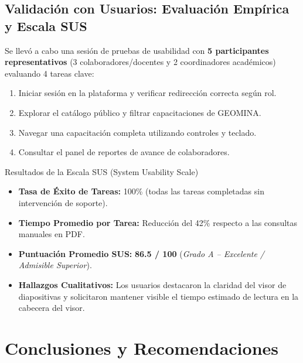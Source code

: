 \documentclass[11pt,a4paper]{article}
\begin{document}
\subsection{Validación con Usuarios: Evaluación Empírica y Escala SUS}
Se llevó a cabo una sesión de pruebas de usabilidad con \textbf{5 participantes representativos} (3 colaboradores/docentes y 2 coordinadores académicos) evaluando 4 tareas clave:
\begin{enumerate}
    \item Iniciar sesión en la plataforma y verificar redirección correcta según rol.
    \item Explorar el catálogo público y filtrar capacitaciones de GEOMINA.
    \item Navegar una capacitación completa utilizando controles y teclado.
    \item Consultar el panel de reportes de avance de colaboradores.
\end{enumerate}

\begin{infobox}{Resultados de la Escala SUS (System Usability Scale)}
    \begin{itemize}
        \item \textbf{Tasa de Éxito de Tareas:} 100\% (todas las tareas completadas sin intervención de soporte).
        \item \textbf{Tiempo Promedio por Tarea:} Reducción del 42\% respecto a las consultas manuales en PDF.
        \item \textbf{Puntuación Promedio SUS:} \textbf{86.5 / 100} (\textit{Grado A -- Excelente / Admisible Superior}).
        \item \textbf{Hallazgos Cualitativos:} Los usuarios destacaron la claridad del visor de diapositivas y solicitaron mantener visible el tiempo estimado de lectura en la cabecera del visor.
    \end{itemize}
\end{infobox}

\section{Conclusiones y Recomendaciones}
\end{document}
